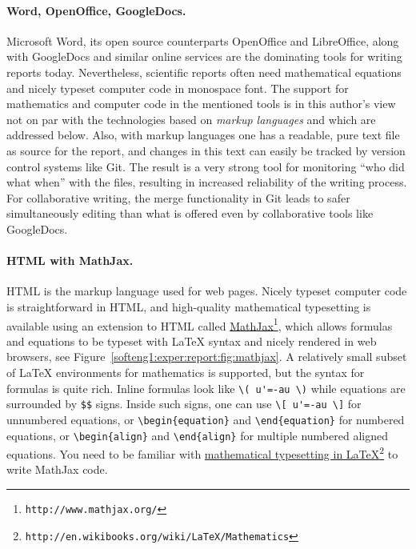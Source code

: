 \documentclass[graybox,sectrefs,envcountresetchap,open=right,final]{svmonodo}
\begin{document}

\paragraph{Word, OpenOffice, GoogleDocs.}
Microsoft Word, its open source counterparts OpenOffice and
LibreOffice, along with GoogleDocs and similar online services are the
dominating tools for writing reports today. Nevertheless, scientific
reports often need mathematical equations and nicely typeset computer
code in monospace font. The support for mathematics and computer code
in the mentioned tools is in this author's view not on par with the
technologies based on \emph{markup languages} and which are addressed
below. Also, with markup languages one has a readable, pure text file
as source for the report, and changes in this text can easily be
tracked by version control systems like Git. The result is a very
strong tool for monitoring ``who did what when'' with the files,
resulting in increased reliability of the writing process. For
collaborative writing, the merge functionality in Git leads to safer
simultaneously editing than what is offered even by collaborative
tools like GoogleDocs.


\paragraph{HTML with MathJax.}
HTML is the markup language used for web pages.  Nicely typeset computer
code is straightforward in HTML, and high-quality mathematical
typesetting is available using an extension to HTML called \href{{http://www.mathjax.org/}}{MathJax}\footnote{\texttt{http://www.mathjax.org/}}, which allows formulas and equations to be
typeset with {\LaTeX} syntax and nicely rendered in web browsers, see
Figure~\ref{softeng1:exper:report:fig:mathjax}.  A relatively small
subset of {\LaTeX} environments for mathematics is supported, but the
syntax for formulas is quite rich. Inline formulas look like \Verb!\( u'=-au \)! while equations are surrounded by \Verb!$$! signs.  Inside such
signs, one can use \Verb!\[ u'=-au \]! for unnumbered equations, or
\Verb!\begin{equation}! and \Verb!\end{equation}! for
numbered equations, or \Verb!\begin{align}! and \Verb!\end{align}! for multiple
numbered aligned equations.  You need to be familiar with \href{{http://en.wikibooks.org/wiki/LaTeX/Mathematics}}{mathematical
typesetting in LaTeX}\footnote{\texttt{http://en.wikibooks.org/wiki/LaTeX/Mathematics}} to write MathJax
code.
\end{document}
